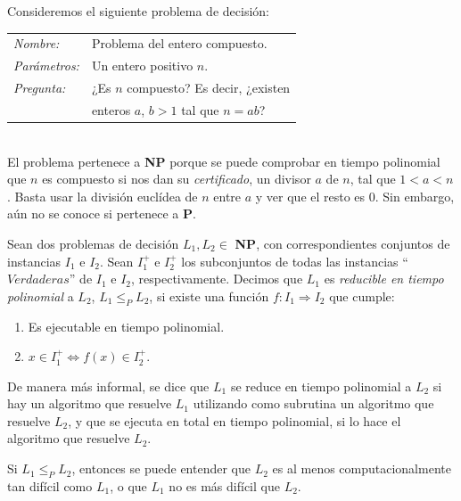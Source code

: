 \begin{example}
	Consideremos el siguiente problema de decisión:
	
	\begin{tabular}{|ll}
		\textit{Nombre:} & Problema del entero compuesto. \\
		\textit{Parámetros:} & Un entero positivo $n$. \\
		\textit{Pregunta:} & ¿Es $n$ compuesto? Es decir, ¿existen \\
		&  enteros $a$, $b > 1$ tal que $n=ab$? \\
	\end{tabular}
	\\
	
	El problema pertenece a \textbf{NP} porque se puede comprobar en tiempo polinomial que $n$ es compuesto si nos dan su \textit{certificado}, un divisor $a$ de $n$, tal que $1 < a < n$. Basta usar la división euclídea de $n$ entre $a$ y ver que el resto es $0$. Sin embargo, aún no se conoce si pertenece a \textbf{P}.
\end{example}


\hfil

\begin{definition}
	\label{reducePoly:def}
	Sean dos problemas de decisión $L_1, L_2 \in $ \textbf{NP}, con correspondientes conjuntos de instancias $I_1$ e $I_2$. Sean $I_1^+$ e $I_2^+$ los subconjuntos de todas las instancias ``$Verdaderas$'' de $I_1$ e $I_2$, respectivamente. Decimos que $L_1$ es \textit{reducible en tiempo polinomial} a $L_2$, $L_1 \leq_P L_2$, si existe una función $f:I_1 \Rightarrow I_2$ que cumple:
	
	\begin{enumerate}
		\item Es ejecutable en tiempo polinomial.
		\item $x \in I_1^+  \Leftrightarrow  f(x) \in I_2^+ $.
	\end{enumerate}
\end{definition}

\hfil

De manera más informal, se dice que $L_1$ se reduce en tiempo polinomial a $L_2$ si hay un algoritmo que resuelve $L_1$ utilizando como subrutina un algoritmo que resuelve $L_2$, y que se ejecuta en total en tiempo polinomial, si lo hace el algoritmo que resuelve $L_2$.

Si $L_1 \leq_P L_2$, entonces se puede entender que $L_2$ es al menos computacionalmente tan difícil como $L_1$, o que $L_1$ no es más difícil que $L_2$.

